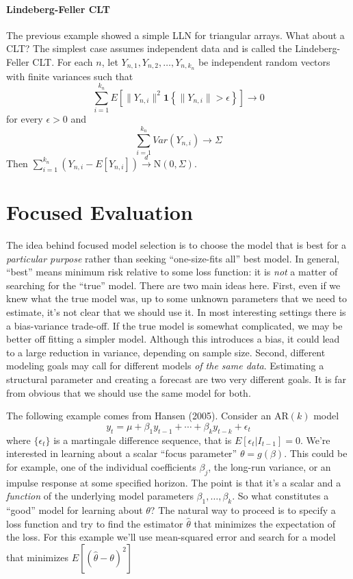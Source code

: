 \paragraph{Lindeberg-Feller CLT}
The previous example showed a simple LLN for triangular arrays. 
What about a CLT? 
The simplest case assumes independent data and is called the Lindeberg-Feller CLT. 
For each $n$, let $Y_{n,1}, Y_{n,2}, \hdots, Y_{n,k_n}$ be independent random vectors with finite variances such that
$$\sum_{i=1}^{k_n} E\left[ \lVert Y_{n,i} \rVert^2 \mathbf{1}\left\{ \lVert Y_{n,i} \rVert > \epsilon\right\} \right] \rightarrow 0$$
for every $\epsilon > 0$ and
$$\sum_{i=1}^{k_n} Var(Y_{n,i}) \rightarrow \Sigma$$
Then $\sum_{i=1}^{k_n} \left(Y_{n,i}-E\left[ Y_{n,i} \right]\right) \overset{d}{\rightarrow} \mbox{N}(0,\Sigma)$.



\section{Focused Evaluation}
The idea behind focused model selection is to choose the model that is best for a \emph{particular purpose} rather than seeking ``one-size-fits all'' best model. 
In general, ``best'' means minimum risk relative to some loss function: it is \emph{not} a matter of searching for the ``true'' model. 
There are two main ideas here. 
First, even if we knew what the true model was, up to some unknown parameters that we need to estimate, it's not clear that we should use it. 
In most interesting settings there is a bias-variance trade-off. 
If the true model is somewhat complicated, we may be better off fitting a simpler model. Although this introduces a bias, it could lead to a large reduction in variance, depending on sample size.
Second, different modeling goals may call for different models \emph{of the same data}.
Estimating a structural parameter and creating a forecast are two very different goals. 
It is far from obvious that we should use the same model for both.

The following example comes from Hansen (2005).
Consider an AR$(k)$ model
$$y_t = \mu + \beta_1 y_{t-1} + \cdots + \beta_k y_{t-k} + \epsilon_t$$
where $\{\epsilon_t\}$ is a martingale difference sequence, that is $E[\epsilon_t|I_{t-1}] = 0$.
We're interested in learning about a scalar ``focus parameter'' $\theta = g(\beta)$. 
This could be for example, one of the individual coefficients $\beta_j$, the long-run variance, or an impulse response at some specified horizon. 
The point is that it's a scalar and a \emph{function} of the underlying model parameters $\beta_1, \hdots, \beta_k$. So what constitutes a ``good'' model for learning about $\theta$? 
The natural way to proceed is to specify a loss function and try to find the estimator $\widehat{\theta}$ that minimizes the expectation of the loss.
For this example we'll use mean-squared error and search for a model that minimizes $E[(\widehat{\theta} - \theta)^2]$

